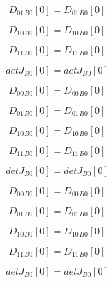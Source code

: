 \documentclass{article}
\begin{document}
\begin{dmath}{D_{01}{_{B0}}}[{0}] = {D_{01}{_{B0}}}[{0}]\end{dmath}

\begin{dmath}{D_{10}{_{B0}}}[{0}] = {D_{10}{_{B0}}}[{0}]\end{dmath}

\begin{dmath}{D_{11}{_{B0}}}[{0}] = {D_{11}{_{B0}}}[{0}]\end{dmath}

\begin{dmath}{detJ{_{B0}}}[{0}] = {detJ{_{B0}}}[{0}]\end{dmath}

\begin{dmath}{D_{00}{_{B0}}}[{0}] = {D_{00}{_{B0}}}[{0}]\end{dmath}

\begin{dmath}{D_{01}{_{B0}}}[{0}] = {D_{01}{_{B0}}}[{0}]\end{dmath}

\begin{dmath}{D_{10}{_{B0}}}[{0}] = {D_{10}{_{B0}}}[{0}]\end{dmath}

\begin{dmath}{D_{11}{_{B0}}}[{0}] = {D_{11}{_{B0}}}[{0}]\end{dmath}

\begin{dmath}{detJ{_{B0}}}[{0}] = {detJ{_{B0}}}[{0}]\end{dmath}

\begin{dmath}{D_{00}{_{B0}}}[{0}] = {D_{00}{_{B0}}}[{0}]\end{dmath}

\begin{dmath}{D_{01}{_{B0}}}[{0}] = {D_{01}{_{B0}}}[{0}]\end{dmath}

\begin{dmath}{D_{10}{_{B0}}}[{0}] = {D_{10}{_{B0}}}[{0}]\end{dmath}

\begin{dmath}{D_{11}{_{B0}}}[{0}] = {D_{11}{_{B0}}}[{0}]\end{dmath}

\begin{dmath}{detJ{_{B0}}}[{0}] = {detJ{_{B0}}}[{0}]\end{dmath}
\end{document}
